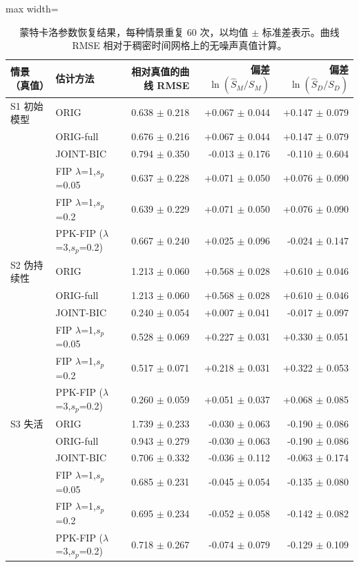 \begin{table}[t]
\centering
\caption{蒙特卡洛参数恢复结果，每种情景重复 60 次，以均值 $\pm$ 标准差表示。曲线 RMSE 相对于稠密时间网格上的无噪声真值计算。}\label{tab:sim}
\footnotesize
\begin{adjustbox}{max width=\linewidth}
\begin{tabular}{llrrr}
\toprule
情景（真值） & 估计方法 & 相对真值的曲线 RMSE & 偏差 $\ln(\hat S_M/S_M)$ & 偏差 $\ln(\hat S_D/S_D)$ \\
\midrule
S1 初始模型 & ORIG & 0.638 $\pm$ 0.218 & +0.067 $\pm$ 0.044 & +0.147 $\pm$ 0.079 \\
 & ORIG-full & 0.676 $\pm$ 0.216 & +0.067 $\pm$ 0.044 & +0.147 $\pm$ 0.079 \\
 & JOINT-BIC & 0.794 $\pm$ 0.350 & -0.013 $\pm$ 0.176 & -0.110 $\pm$ 0.604 \\
 & FIP $\lambda$=1,$s_p$=0.05 & 0.637 $\pm$ 0.228 & +0.071 $\pm$ 0.050 & +0.076 $\pm$ 0.090 \\
 & FIP $\lambda$=1,$s_p$=0.2 & 0.639 $\pm$ 0.229 & +0.071 $\pm$ 0.050 & +0.076 $\pm$ 0.090 \\
 & PPK-FIP ($\lambda$=3,$s_p$=0.2) & 0.667 $\pm$ 0.240 & +0.025 $\pm$ 0.096 & -0.024 $\pm$ 0.147 \\
\midrule
S2 伪持续性 & ORIG & 1.213 $\pm$ 0.060 & +0.568 $\pm$ 0.028 & +0.610 $\pm$ 0.046 \\
 & ORIG-full & 1.213 $\pm$ 0.060 & +0.568 $\pm$ 0.028 & +0.610 $\pm$ 0.046 \\
 & JOINT-BIC & 0.240 $\pm$ 0.054 & +0.007 $\pm$ 0.041 & -0.017 $\pm$ 0.097 \\
 & FIP $\lambda$=1,$s_p$=0.05 & 0.528 $\pm$ 0.069 & +0.227 $\pm$ 0.031 & +0.330 $\pm$ 0.051 \\
 & FIP $\lambda$=1,$s_p$=0.2 & 0.517 $\pm$ 0.071 & +0.218 $\pm$ 0.031 & +0.322 $\pm$ 0.053 \\
 & PPK-FIP ($\lambda$=3,$s_p$=0.2) & 0.260 $\pm$ 0.059 & +0.051 $\pm$ 0.037 & +0.068 $\pm$ 0.085 \\
\midrule
S3 失活 & ORIG & 1.739 $\pm$ 0.233 & -0.030 $\pm$ 0.063 & -0.190 $\pm$ 0.086 \\
 & ORIG-full & 0.943 $\pm$ 0.279 & -0.030 $\pm$ 0.063 & -0.190 $\pm$ 0.086 \\
 & JOINT-BIC & 0.706 $\pm$ 0.332 & -0.036 $\pm$ 0.112 & -0.063 $\pm$ 0.174 \\
 & FIP $\lambda$=1,$s_p$=0.05 & 0.685 $\pm$ 0.231 & -0.045 $\pm$ 0.054 & -0.135 $\pm$ 0.080 \\
 & FIP $\lambda$=1,$s_p$=0.2 & 0.695 $\pm$ 0.234 & -0.052 $\pm$ 0.058 & -0.142 $\pm$ 0.082 \\
 & PPK-FIP ($\lambda$=3,$s_p$=0.2) & 0.718 $\pm$ 0.267 & -0.074 $\pm$ 0.079 & -0.129 $\pm$ 0.109 \\
\bottomrule
\end{tabular}
\end{adjustbox}
\end{table}
